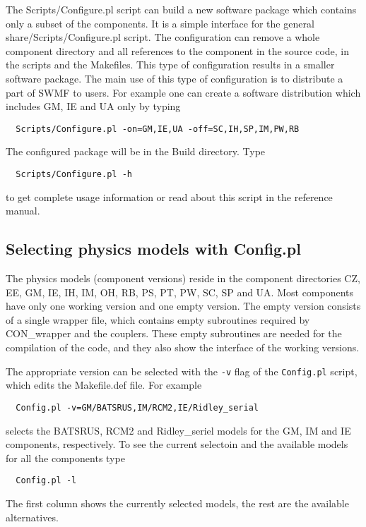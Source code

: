 The Scripts/Configure.pl script can build a new software package which
contains only a subset of the components. It is a simple interface
for the general share/Scripts/Configure.pl script. The configuration
can remove a whole component directory and all references to the component 
in the source code, in the scripts and the Makefiles.
This type of configuration results in a smaller software package.
The main use of this type of configuration is to distribute
a part of SWMF to users. For example one can create a 
software distribution which includes GM, IE and UA only by typing
\begin{verbatim}
  Scripts/Configure.pl -on=GM,IE,UA -off=SC,IH,SP,IM,PW,RB
\end{verbatim}
The configured package will be in the Build directory.  Type
\begin{verbatim}
  Scripts/Configure.pl -h
\end{verbatim}
to get complete usage information or read about this script 
in the reference manual.

\subsection{Selecting physics models with Config.pl}

The physics models (component versions) reside in the component 
directories CZ, EE, GM, IE, IH, IM, OH, RB, PS, PT, PW, SC, SP and UA.
Most components have only one working version and one empty version.
The empty version consists of a single wrapper file, which contains 
empty subroutines required by CON\_wrapper and the couplers.
These empty subroutines are needed for the compilation of the code,
and they also show the interface of the working versions.

The appropriate version can be selected with the {\tt -v} flag
of the {\tt Config.pl} script, which edits the Makefile.def file.
For example
\begin{verbatim}
  Config.pl -v=GM/BATSRUS,IM/RCM2,IE/Ridley_serial
\end{verbatim}
selects the BATSRUS, RCM2 and Ridley\_seriel models for
the GM, IM and IE components, respectively.
To see the current selectoin and the available models for all
the components type
\begin{verbatim}
  Config.pl -l
\end{verbatim}
The first column shows the currently selected models, the rest are the 
available alternatives.


